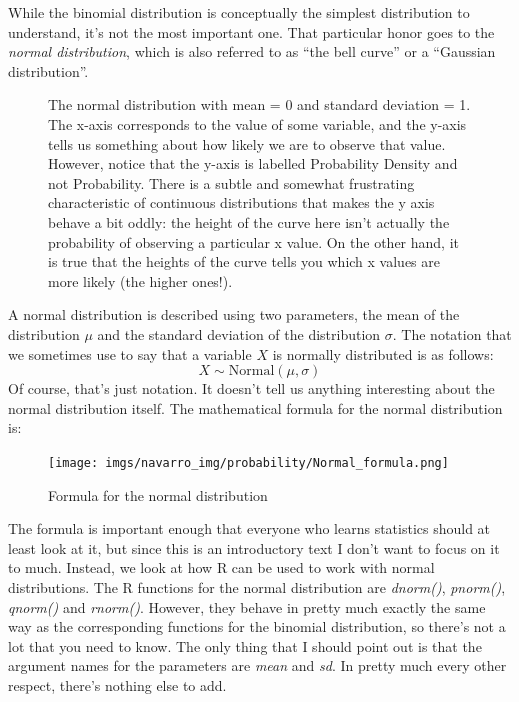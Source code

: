 \documentclass[
  letterpaper,
  DIV=11,
  numbers=noendperiod]{scrreprt}
\begin{document}
While the binomial distribution is conceptually the simplest
distribution to understand, it's not the most important one. That
particular honor goes to the \emph{normal distribution}, which is also
referred to as ``the bell curve'' or a ``Gaussian distribution''.

\begin{figure}


\caption{\label{fig-4normal}The normal distribution with mean = 0 and
standard deviation = 1. The x-axis corresponds to the value of some
variable, and the y-axis tells us something about how likely we are to
observe that value. However, notice that the y-axis is labelled
Probability Density and not Probability. There is a subtle and somewhat
frustrating characteristic of continuous distributions that makes the y
axis behave a bit oddly: the height of the curve here isn't actually the
probability of observing a particular x value. On the other hand, it is
true that the heights of the curve tells you which x values are more
likely (the higher ones!).}

\end{figure}%

A normal distribution is described using two parameters, the mean of the
distribution \(\mu\) and the standard deviation of the distribution
\(\sigma\). The notation that we sometimes use to say that a variable
\(X\) is normally distributed is as follows:
\[X \sim \mbox{Normal}(\mu,\sigma)\] Of course, that's just notation. It
doesn't tell us anything interesting about the normal distribution
itself. The mathematical formula for the normal distribution is:

\begin{figure}[H]

{\centering \texttt{[image: imgs/navarro\_img/probability/Normal\_formula.png]}

}

\caption{Formula for the normal distribution}

\end{figure}%

The formula is important enough that everyone who learns statistics
should at least look at it, but since this is an introductory text I
don't want to focus on it to much. Instead, we look at how R can be used
to work with normal distributions. The R functions for the normal
distribution are \emph{dnorm()}, \emph{pnorm()}, \emph{qnorm()} and
\emph{rnorm()}. However, they behave in pretty much exactly the same way
as the corresponding functions for the binomial distribution, so there's
not a lot that you need to know. The only thing that I should point out
is that the argument names for the parameters are \emph{mean} and
\emph{sd}. In pretty much every other respect, there's nothing else to
add.
\end{document}
